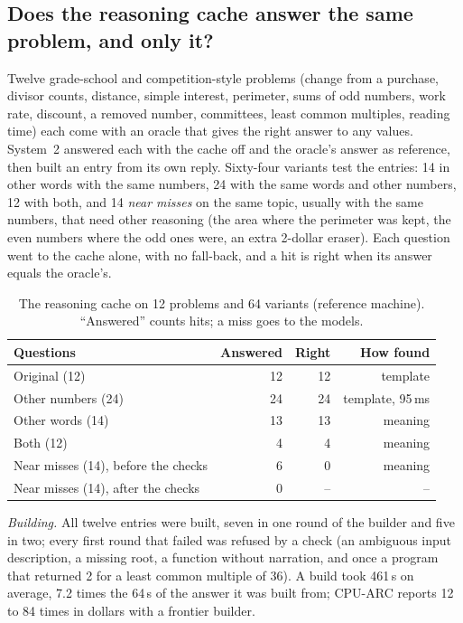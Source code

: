 \subsection{Does the reasoning cache answer the same problem, and only it?}
\label{sec:eval:arc}
Twelve grade-school and competition-style problems (change from a purchase,
divisor counts, distance, simple interest, perimeter, sums of odd numbers,
work rate, discount, a removed number, committees, least common multiples,
reading time) each come with an oracle that gives the right answer to any
values. System~2 answered each with the cache off and the oracle's answer as
reference, then built an entry from its own reply. Sixty-four variants test
the entries: 14 in other words with the same numbers, 24 with the same words
and other numbers, 12 with both, and 14 \emph{near misses} on the same topic,
usually with the same numbers, that need other reasoning (the area where the
perimeter was kept, the even numbers where the odd ones were, an extra
2-dollar eraser). Each question went to the cache alone, with no fall-back,
and a hit is right when its answer equals the oracle's.

\begin{table}[t]
\centering
\caption{The reasoning cache on 12 problems and 64 variants (reference
machine). ``Answered'' counts hits; a miss goes to the models.}
\label{tab:arc}
\begin{tabular}{@{}lrrr@{}}
\toprule
Questions & Answered & Right & How found \\
\midrule
Original (12) & 12 & 12 & template \\
Other numbers (24) & 24 & 24 & template, 95\,ms \\
Other words (14) & 13 & 13 & meaning \\
Both (12) & 4 & 4 & meaning \\
Near misses (14), before the checks & 6 & 0 & meaning \\
Near misses (14), after the checks & 0 & -- & -- \\
\bottomrule
\end{tabular}
\end{table}

\emph{Building.} All twelve entries were built, seven in one round of the
builder and five in two; every first round that failed was refused by a check
(an ambiguous input description, a missing root, a function without
narration, and once a program that returned 2 for a least common multiple of
36). A build took 461\,s on average, 7.2 times the 64\,s of the answer it was
built from; CPU-ARC reports 12 to 84 times in dollars with a frontier builder.

